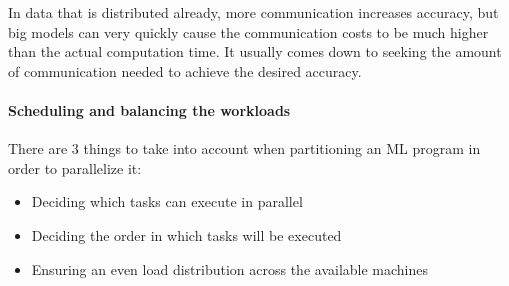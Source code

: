 In data that is distributed already, more communication increases accuracy, but big models can very quickly cause the communication costs to be much higher than the actual computation time. It usually comes down to seeking the amount of communication needed to achieve the desired accuracy.


\paragraph{Scheduling and balancing the workloads}
There are 3 things to take into account when partitioning an ML program in order to parallelize it:\cite{Xing16}\\
\begin{itemize}
	\item Deciding which tasks can execute in parallel
	\item Deciding the order in which tasks will be executed
	\item Ensuring an even load distribution across the available machines
\end{itemize}


